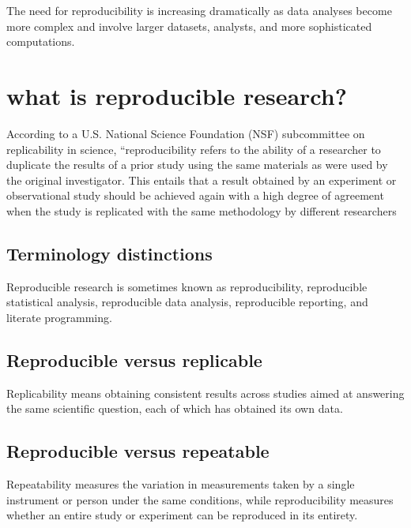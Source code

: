 \documentclass[
  12pt,
]{book}
\begin{document}
The need for reproducibility is increasing dramatically as data analyses become more complex and involve larger datasets, analysts, and more sophisticated computations.

\hypertarget{what-is-reproducible-research}{%
\section{what is reproducible research?}\label{what-is-reproducible-research}}

According to a U.S. National Science Foundation (NSF) subcommittee on replicability in science, ``reproducibility refers to the ability of a researcher to duplicate the results of a prior study using the same materials as were used by the original investigator. This entails that a result obtained by an experiment or observational study should be achieved again with a high degree of agreement when the study is replicated with the same methodology by different researchers

\hypertarget{terminology-distinctions}{%
\subsection{Terminology distinctions}\label{terminology-distinctions}}

Reproducible research is sometimes known as reproducibility, reproducible statistical analysis, reproducible data analysis, reproducible reporting, and literate programming.

\hypertarget{reproducible-versus-replicable}{%
\subsection{Reproducible versus replicable}\label{reproducible-versus-replicable}}

Replicability means obtaining consistent results across studies aimed at answering the same scientific question, each of which has obtained its own data.

\hypertarget{reproducible-versus-repeatable}{%
\subsection{Reproducible versus repeatable}\label{reproducible-versus-repeatable}}

Repeatability measures the variation in measurements taken by a single instrument or person under the same conditions, while reproducibility measures whether an entire study or experiment can be reproduced in its entirety.
\end{document}
